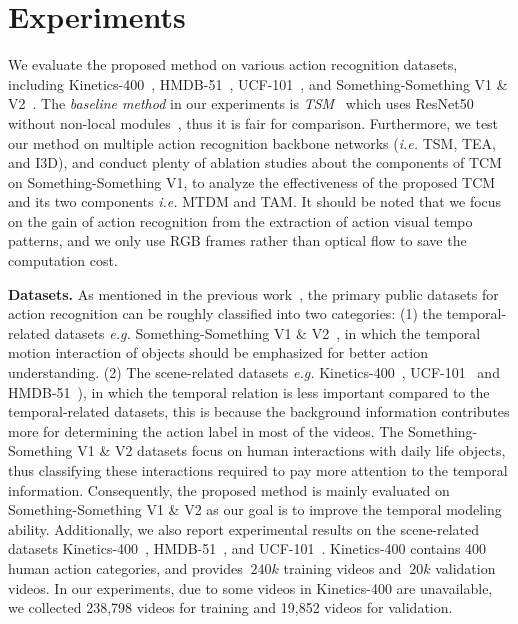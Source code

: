 \documentclass[journal]{IEEEtran}
\begin{document}
\section{Experiments}
We evaluate the proposed method on various action recognition datasets, including Kinetics-400~\cite{kay2017kinetics}, HMDB-51~\cite{Kuehne11}, UCF-101~\cite{soomro2012ucf101}, and Something-Something V1 \& V2~\cite{goyal2017something}. The \textit{baseline method} in our experiments is \textit{TSM}~\cite{lin2019tsm} which uses ResNet50~\cite{he2016deep} without non-local modules~\cite{NonLocal2018}, thus it is fair for comparison. Furthermore, we test our method on multiple action recognition backbone networks (\textit{i.e.} TSM, TEA, and I3D), and conduct plenty of ablation studies about the components of TCM on Something-Something V1, to analyze the effectiveness of the proposed TCM and its two components \textit{i.e.} MTDM and TAM. It should be noted that we focus on the gain of action recognition from the extraction of action visual tempo patterns, and we only use RGB frames rather than optical flow to save the computation cost.

\noindent \textbf{Datasets.}
As mentioned in the previous work~\cite{jiang2019stm}, the primary public datasets for action recognition can be roughly classified into two categories: (1) the temporal-related datasets \textit{e.g.} Something-Something V1 $\&$ V2~\cite{goyal2017something}, in which the temporal motion interaction of objects should be emphasized for better action understanding. (2) The scene-related datasets \textit{e.g.} Kinetics-400~\cite{kay2017kinetics}, UCF-101~\cite{soomro2012ucf101} and HMDB-51~\cite{Kuehne11}), in which the temporal relation is less important compared to the temporal-related datasets, this is because the background information contributes more for determining the action label in most of the videos. The Something-Something V1 \& V2 datasets focus on human interactions with daily life objects, thus classifying these interactions required to pay more attention to the temporal information. Consequently, the proposed method is mainly evaluated on Something-Something V1 \& V2 as our goal is to improve the temporal modeling ability. Additionally, we also report experimental results on the scene-related datasets Kinetics-400~\cite{kay2017kinetics}, HMDB-51~\cite{Kuehne11}, and UCF-101~\cite{soomro2012ucf101}. Kinetics-400 contains 400 human action categories, and provides $~240k$ training videos and $~20k$ validation videos. In our experiments, due to some videos in Kinetics-400 are unavailable, we collected 238,798 videos for training and 19,852 videos for validation.
\end{document}
